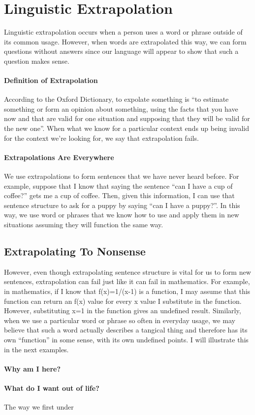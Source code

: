 \documentclass[a4paper, 12pt]{article}
\begin{document}
\section*{Linguistic Extrapolation}
Linguistic extrapolation occurs when a person uses a word or phrase outside of its common usage. However, when words are extrapolated this way, we can form questions without answers since our language will appear to show that such a question makes sense.
\paragraph{Definition of Extrapolation}
According to the Oxford Dictionary, to expolate something is ``to estimate something or form an opinion about something, using the facts that you have now and that are valid for one situation and supposing that they will be valid for the new one''. When what we know for a particular context ends up being invalid for the context we're looking for, we say that extrapolation fails.
\paragraph{Extrapolations Are Everywhere}
We use extrapolations to form sentences that we have never heard before. For example, suppose that I know that saying the sentence ``can I have a cup of coffee?'' gets me a cup of coffee. Then, given this information, I can use that sentence structure to ask for a puppy by saying ``can I have a puppy?''. In this way, we use word or phrases that we know how to use and apply them in new situations assuming they will function the same way.
\subsection{Extrapolating To Nonsense}
However, even though extrapolating sentence structure is vital for us to form new sentences, extrapolation can fail just like it can fail in mathematics. For example, in mathematics, if I know that f(x)=1/(x-1) is a function, I may assume that this function can return an f(x) value for every x value I substitute in the function. However, substituting x=1 in the function gives an undefined result. Similarly, when we use a particular word or phrase so often in everyday usage, we may believe that such a word actually describes a tangical thing and therefore has its own ``function'' in some sense, with its own undefined points. I will illustrate this in the next examples.
\paragraph{Why am I here?}
\paragraph{What do I want out of life?}


The way we first under
\end{document}
